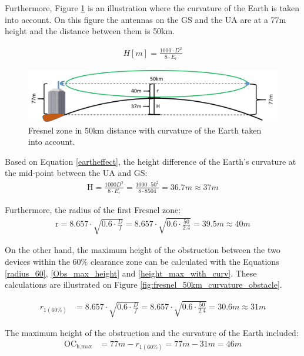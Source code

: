 Furthermore, Figure \ref{fig:fresnel_50km_curvature} is an illustration where the curvature of the Earth is taken into account. On this figure the antennas on the GS and the UA are at a 77m height and the distance between them is 50km. 

\begin{align}
H [m] = \frac{1000\cdot D^2}{8\cdot E_r}\label{eartheffect}
\end{align}

\begin{figure}[H]
	\centering
	\includegraphics[scale=0.50]{figures/fresnel_50km_curvature.png}
	\caption{Fresnel zone in 50km distance with curvature of the Earth taken into account.}
	\label{fig:fresnel_50km_curvature}
\end{figure}

Based on Equation \ref{eartheffect}, the height difference of the Earth's curvature at the mid-point between the UA and GS:
\begin{align}
\text{H} = \frac{1000 D^2}{8 \cdot E_r} = \frac{1000 \cdot 50^2}{8\cdot 8504} = 36.7m \approx 37m 
\end{align}

Furthermore, the radius of the first Fresnel zone:
\begin{align*}
\text{r} = 8.657\cdot \sqrt{0.6\cdot\frac{D}{f}} = 8.657\cdot \sqrt{0.6\cdot\frac{50}{2.4}} = 39.5m \approx 40m 
\end{align*}

On the other hand, the maximum height of the obstruction between the two devices within the 60$\%$ clearance zone can be calculated with the Equations \ref{radius_60}, \ref{Obs_max_height} and \ref{height_max_with_curv}. These calculations are illustrated on Figure \ref{fig:fresnel_50km_curvature_obstacle}.

\begin{align}
r_{1(60\%)} &= 8.657\cdot \sqrt{0.6\cdot\frac{D}{f}} = 8.657\cdot \sqrt{0.6\cdot\frac{50}{2.4}} = 30.6m \approx 31m \label{radius_60}
\end{align}

The maximum height of the obstruction and the curvature of the Earth included:
\begin{align}
\text{OC}_{\text{h,max}} &= 77m - r_{1(60\%)} = 77m - 31m = 46m \label{Obs_max_height}
\end{align}

